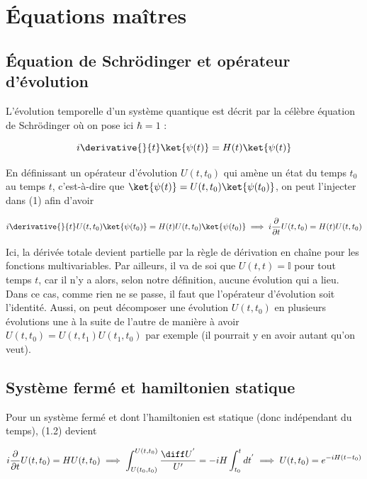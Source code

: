 \section{Équations maîtres}
\subsection{Équation de Schrödinger et opérateur d'évolution}
L'évolution temporelle d'un système quantique est décrit par la célèbre équation de Schrödinger où on pose ici $\hbar = 1$ :

\begin{equation}
    i\derivative{}{t}\ket{\psi(t)} = H(t)\ket{\psi(t)}
\end{equation}

En définissant un opérateur d'évolution $U(t,t_0)$ qui amène un état du temps $t_0$ au temps $t$, c'est-à-dire que $\ket{\psi(t)} = U(t,t_0)\ket{\psi(t_0)}$, on peut l'injecter dans (1) afin d'avoir 

\begin{equation}
    i \derivative{}{t}U(t,t_0)\ket{\psi(t_0)} = H(t)U(t,t_0)\ket{\psi(t_0)} \implies i \frac{\partial}{\partial t}U(t,t_0) = H(t)U(t,t_0)
\end{equation}

Ici, la dérivée totale devient partielle par la règle de dérivation en chaîne pour les fonctions multivariables. Par ailleurs, il va de soi que $U(t,t) = \mathbb{I}$ pour tout temps $t$, car il n'y a alors, selon notre définition, aucune évolution qui a lieu. Dans ce cas, comme rien ne se passe, il faut que l'opérateur d'évolution soit l'identité. Aussi, on peut décomposer une évolution $U(t, t_0)$ en plusieurs évolutions une à la suite de l'autre de manière à avoir $U(t,t_0) = U(t,t_1)U(t_1,t_0)$ par exemple (il pourrait y en avoir autant qu'on veut).

\subsection{Système fermé et hamiltonien statique}
Pour un système fermé et dont l'hamiltonien est statique (donc indépendant du temps), (1.2) devient

\begin{equation}
    i\frac{\partial}{\partial t}U(t,t_0) = HU(t,t_0) \implies \int_{U(t_0,t_0)}^{U(t,t_0)}\frac{\diff U^{'}}{U'} = -iH \int_{t_0}^{t}dt^{'} \implies U(t,t_0) = e^{-iH(t-t_0)}
\end{equation}

